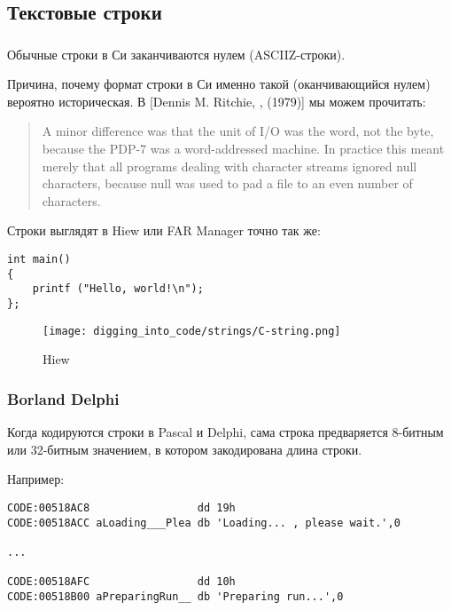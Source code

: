 \subsection{Текстовые строки}

\subsubsection{\CCpp}

\label{C_strings}
Обычные строки в Си заканчиваются нулем (\ac{ASCIIZ}-строки).

Причина, почему формат строки в Си именно такой (оканчивающийся нулем) вероятно историческая.
В [Dennis M. Ritchie, , (1979)]
мы можем прочитать:

\begin{framed}
\begin{quotation}
A minor difference was that the unit of I/O was the word, not the byte, because the PDP-7 was a word-addressed
machine. In practice this meant merely that all programs dealing with character streams ignored null
characters, because null was used to pad a file to an even number of characters.
\end{quotation}
\end{framed}

Строки выглядят в Hiew или FAR Manager точно так же:

\begin{lstlisting}[style=customc]
int main()
{
	printf ("Hello, world!\n");
};
\end{lstlisting}

\begin{figure}[H]
\centering
\texttt{[image: digging\_into\_code/strings/C-string.png]}
\caption{Hiew}
\end{figure}


\subsubsection{Borland Delphi}
Когда кодируются строки в Pascal и Delphi, сама строка предваряется 8-битным или 32-битным значением, в котором закодирована длина строки.

Например:

\begin{lstlisting}[caption=Delphi,style=customasmx86]
CODE:00518AC8                 dd 19h
CODE:00518ACC aLoading___Plea db 'Loading... , please wait.',0

...

CODE:00518AFC                 dd 10h
CODE:00518B00 aPreparingRun__ db 'Preparing run...',0
\end{lstlisting}

